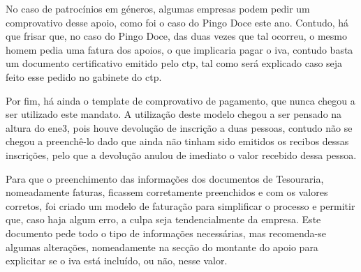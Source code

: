 No caso de patrocínios em géneros, algumas empresas podem pedir um comprovativo desse apoio, como foi o caso do Pingo Doce este ano. Contudo, há que frisar que, no caso do Pingo Doce, das duas vezes que tal ocorreu, o mesmo homem pedia uma fatura dos apoios, o que implicaria pagar o \acrfull{iva}, contudo basta um documento certificativo emitido pelo \acrshort{ctp}, tal como será explicado caso seja feito esse pedido no gabinete do \acrshort{ctp}.

Por fim, há ainda o template de comprovativo de pagamento, que nunca chegou a ser utilizado este mandato. A utilização deste modelo chegou a ser pensado na altura do \acrshort{ene3}, pois houve devolução de inscrição a duas pessoas, contudo não se chegou a preenchê-lo dado que ainda não tinham sido emitidos os recibos dessas inscrições, pelo que a devolução anulou de imediato o valor recebido dessa pessoa.

Para que o preenchimento das informações dos documentos de Tesouraria, nomeadamente faturas, ficassem corretamente preenchidos e com os valores corretos, foi criado um modelo de faturação para simplificar o processo e permitir que, caso haja algum erro, a culpa seja tendencialmente da empresa. Este documento pede todo o tipo de informações necessárias, mas recomenda-se algumas alterações, nomeadamente na secção do montante do apoio para explicitar se o \acrshort{iva} está incluído, ou não, nesse valor.